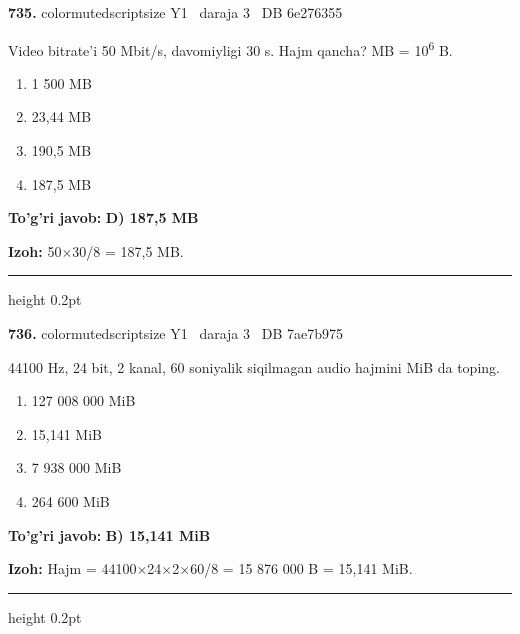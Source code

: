 \documentclass[10pt,a4paper,oneside]{article}
\begin{document}
\noindent\textbf{\color{ink}735.}  {color{muted}scriptsize Y1 \textbullet\ daraja 3 \textbullet\ DB 6e276355}
\par
Video bitrate'i 50 Mbit/s, davomiyligi 30 s. Hajm qancha? MB = 10\textsuperscript{6} B.
\begin{enumerate}[label=\Alph*),leftmargin=9mm]
\item 1 500 MB
\item 23,44 MB
\item 190,5 MB
\item 187,5 MB
\end{enumerate}
\begin{tcolorbox}[enhanced,breakable,colback=teal!4,colframe=teal!50!black,boxrule=0.5pt,arc=1.1mm,left=3mm,right=3mm,top=1.7mm,bottom=1.7mm,before skip=2mm,after skip=2mm]
\textbf{\color{teal}To'g'ri javob:} \textbf{D) 187,5 MB}
\par\smallskip
\textbf{Izoh:} 50\ensuremath{\times}30/8 = 187,5 MB.
\end{tcolorbox}
\vspace{2mm}\hrule height 0.2pt \vspace{3mm}

\noindent\textbf{\color{ink}736.}  {color{muted}scriptsize Y1 \textbullet\ daraja 3 \textbullet\ DB 7ae7b975}
\par
44100 Hz, 24 bit, 2 kanal, 60 soniyalik siqilmagan audio hajmini MiB da toping.
\begin{enumerate}[label=\Alph*),leftmargin=9mm]
\item 127 008 000 MiB
\item 15,141 MiB
\item 7 938 000 MiB
\item 264 600 MiB
\end{enumerate}
\begin{tcolorbox}[enhanced,breakable,colback=teal!4,colframe=teal!50!black,boxrule=0.5pt,arc=1.1mm,left=3mm,right=3mm,top=1.7mm,bottom=1.7mm,before skip=2mm,after skip=2mm]
\textbf{\color{teal}To'g'ri javob:} \textbf{B) 15,141 MiB}
\par\smallskip
\textbf{Izoh:} Hajm = 44100\ensuremath{\times}24\ensuremath{\times}2\ensuremath{\times}60/8 = 15 876 000 B = 15,141 MiB.
\end{tcolorbox}
\vspace{2mm}\hrule height 0.2pt \vspace{3mm}
\end{document}
